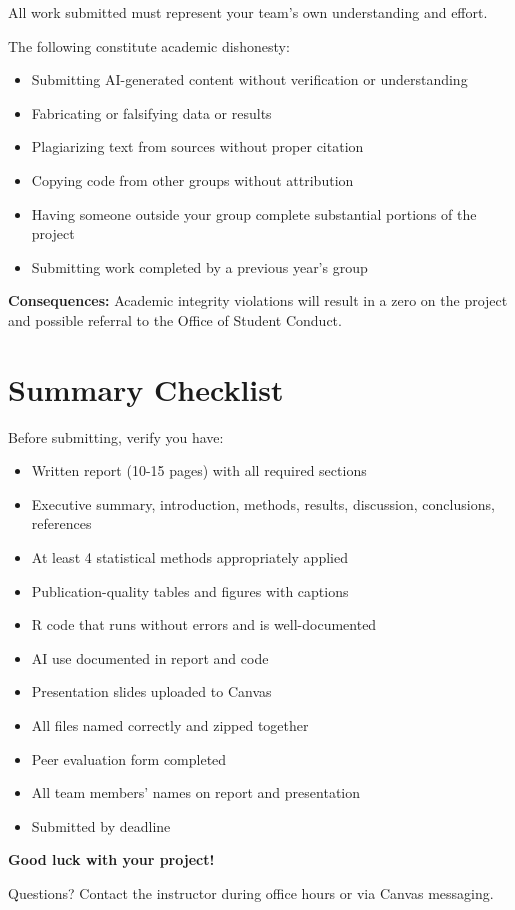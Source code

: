 \documentclass[11pt]{article}
\begin{document}
All work submitted must represent your team's own understanding and effort.

\begin{tcolorbox}[colback=red!10,colframe=red!80,title=Academic Integrity Violations]

The following constitute academic dishonesty:
\begin{itemize}
\item Submitting AI-generated content without verification or understanding
\item Fabricating or falsifying data or results
\item Plagiarizing text from sources without proper citation
\item Copying code from other groups without attribution
\item Having someone outside your group complete substantial portions of the project
\item Submitting work completed by a previous year's group
\end{itemize}

\textbf{Consequences:} Academic integrity violations will result in a zero on the project and possible referral to the Office of Student Conduct.

\end{tcolorbox}

\section{Summary Checklist}

Before submitting, verify you have:

\begin{itemize}
\item[$\square$] Written report (10-15 pages) with all required sections
\item[$\square$] Executive summary, introduction, methods, results, discussion, conclusions, references
\item[$\square$] At least 4 statistical methods appropriately applied
\item[$\square$] Publication-quality tables and figures with captions
\item[$\square$] R code that runs without errors and is well-documented
\item[$\square$] AI use documented in report and code
\item[$\square$] Presentation slides uploaded to Canvas
\item[$\square$] All files named correctly and zipped together
\item[$\square$] Peer evaluation form completed
\item[$\square$] All team members' names on report and presentation
\item[$\square$] Submitted by deadline
\end{itemize}

\vspace{12pt}

\begin{center}
\Large\textbf{Good luck with your project!}
\end{center}

\vspace{8pt}

\noindent Questions? Contact the instructor during office hours or via Canvas messaging.
\end{document}
